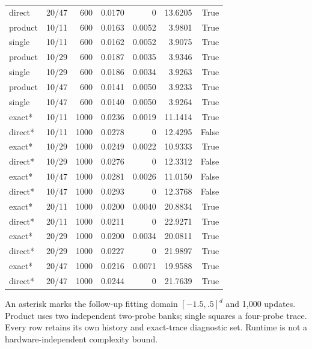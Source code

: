 \begin{longtable}{llrrrrr}
direct & 20/47 & 600 & 0.0170 & 0 & 13.6205 & True\\
product & 10/11 & 600 & 0.0163 & 0.0052 & 3.9801 & True\\
single & 10/11 & 600 & 0.0162 & 0.0052 & 3.9075 & True\\
product & 10/29 & 600 & 0.0187 & 0.0035 & 3.9346 & True\\
single & 10/29 & 600 & 0.0186 & 0.0034 & 3.9263 & True\\
product & 10/47 & 600 & 0.0141 & 0.0050 & 3.9233 & True\\
single & 10/47 & 600 & 0.0140 & 0.0050 & 3.9264 & True\\
exact* & 10/11 & 1000 & 0.0236 & 0.0019 & 11.1414 & True\\
direct* & 10/11 & 1000 & 0.0278 & 0 & 12.4295 & False\\
exact* & 10/29 & 1000 & 0.0249 & 0.0022 & 10.9333 & True\\
direct* & 10/29 & 1000 & 0.0276 & 0 & 12.3312 & False\\
exact* & 10/47 & 1000 & 0.0281 & 0.0026 & 11.0150 & False\\
direct* & 10/47 & 1000 & 0.0293 & 0 & 12.3768 & False\\
exact* & 20/11 & 1000 & 0.0200 & 0.0040 & 20.8834 & True\\
direct* & 20/11 & 1000 & 0.0211 & 0 & 22.9271 & True\\
exact* & 20/29 & 1000 & 0.0200 & 0.0034 & 20.0811 & True\\
direct* & 20/29 & 1000 & 0.0227 & 0 & 21.9897 & True\\
exact* & 20/47 & 1000 & 0.0216 & 0.0071 & 19.9588 & True\\
direct* & 20/47 & 1000 & 0.0244 & 0 & 21.7639 & True\\
\bottomrule\end{longtable}\endgroup
An asterisk marks the follow-up fitting domain $[-1.5,.5]^d$ and 1,000 updates. Product uses two independent two-probe banks; single squares a four-probe trace. Every row retains its own history and exact-trace diagnostic set. Runtime is not a hardware-independent complexity bound.
